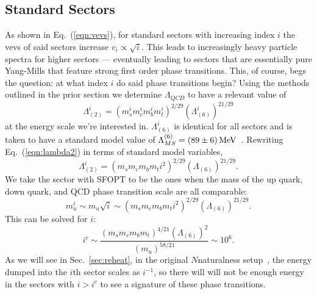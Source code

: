 \documentclass[nofootinbib,twocolumn,preprintnumbers]{revtex4-1}
\begin{document}
\subsection{Standard Sectors}
As shown in Eq.~(\ref{eqn:vevs}), for standard sectors with increasing index $i$ the vevs of said sectors increase $v_i\propto \sqrt{i}$. This leads to increasingly heavy particle spectra for higher sectors --- eventually leading to sectors that are essentially pure Yang-Mills that feature strong first order phase transitions. This, of course, begs the question: at what index $i$ do said phase transitions begin?
Using the methods outlined in the prior section we determine $\Lambda_{QCD}$ to have a relevant value of 
\begin{equation}\label{eqn:lambda2}
\Lambda^i_{(2)} = (m_s^i m_c^i m_b^i m_t^i)^{2/29}(\Lambda^i_{(6)})^{21/29}
\end{equation} 
at the energy scale we're interested in. $\Lambda^i_{(6)}$ is identical for all sectors and is taken to have a standard model value of $\Lambda^{(6)}_{MS} =(89 \pm 6)\, {\rm MeV}$~\cite{PhysRevD.98.030001}. Rewriting Eq.~(\ref{eqn:lambda2}) in terms of standard model variables, 
\begin{equation}\label{eqn:lambda2adj}
\Lambda^i_{(2)} = (m_s m_c m_b m_t i^2)^{2/29}(\Lambda_{(6)})^{21/29}.
\end{equation}
We take the sector with SFOPT to be the ones when the mass of the up quark, down quark, and QCD phase transition scale are all comparable:
\begin{equation}
m^i_u \sim m_u \sqrt{i} \sim (m_s m_c m_b m_t i^2)^{2/29}(\Lambda_{(6)})^{21/29}.
\end{equation}
This can be solved for $i$:
\begin{equation}\label{eqn:critIndex}
i^c \sim \frac{(m_s m_c m_b m_t)^{4/21}(\Lambda_{(6)})^{2}}{( m_u)^{58/21}} \sim 10^6.
\end{equation}
As we will see in Sec.~\ref{sec:reheat}, in the original $N$naturalness setup~\cite{Arkani-Hamed:2016rle}, the energy dumped into the $i$th sector scales as $i^{-1}$, so there will will not be enough energy in the sectors with $i>i^c$ to see a signature of these phase transitions. 
\end{document}
